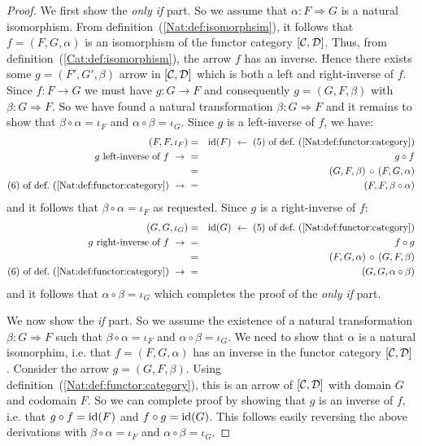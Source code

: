\begin{proof}
    We first show the {\em only if} part. So we assume that 
    $\alpha:F\Rightarrow G$ is a natural isomorphism. From 
    definition~(\ref{Nat:def:isomorphsim}), it follows that
    $f=(F,G,\alpha)$ is an isomorphism of the functor category
    $[\mbox{$\cal C$},\mbox{$\cal D$}]$. Thus, from definition~(\ref{Cat:def:isomorphism}), 
    the arrow $f$ has an inverse. Hence there exists some
    $g=(F',G',\beta)$ arrow in $[\mbox{$\cal C$},\mbox{$\cal D$}]$ which is both a left and
    right-inverse of $f$. Since $f:F\to G$ we must have $g:G\to F$ and
    consequently $g=(G,F,\beta)$ with $\beta:G\Rightarrow F$. So we
    have found a natural transformation $\beta:G\Rightarrow F$ and 
    it remains to show that $\beta\circ\alpha=\iota_{F}$ and 
    $\alpha\circ\beta=\iota_{G}$. Since $g$ is a left-inverse of $f$,
    we have: 
        \begin{eqnarray*}(F,F,\iota_{F})
            &=&\id(F)\ \leftarrow\ 
            \mbox{$(5)$ of def.~(\ref{Nat:def:functor:category})}\\
            \mbox{$g$ left-inverse of $f$}\ \to\ 
            &=&g\circ f\\
            &=&(G,F,\beta)\,\circ\,(F,G,\alpha)\\
            \mbox{$(6)$ of def.~(\ref{Nat:def:functor:category})}\ \to\ 
            &=&(F,F,\beta\circ\alpha)
        \end{eqnarray*}
    and it follows that $\beta\circ\alpha=\iota_{F}$ as requested. Since $g$ is
    a right-inverse of $f$:
        \begin{eqnarray*}(G,G,\iota_{G})
            &=&\id(G)\ \leftarrow\ 
            \mbox{$(5)$ of def.~(\ref{Nat:def:functor:category})}\\
            \mbox{$g$ right-inverse of $f$}\ \to\ 
            &=&f\circ g\\
            &=&(F,G,\alpha)\,\circ\,(G,F,\beta)\\
            \mbox{$(6)$ of def.~(\ref{Nat:def:functor:category})}\ \to\ 
            &=&(G,G,\alpha\circ\beta)
        \end{eqnarray*}
    and it follows that $\alpha\circ\beta=\iota_{G}$ which completes
    the proof of the {\em only if} part.
    
    We now show the {\em if} part. So we assume the existence of a 
    natural transformation $\beta:G\Rightarrow F$ such that 
    $\beta\circ\alpha=\iota_{F}$ and $\alpha\circ\beta=\iota_{G}$.
    We need to show that $\alpha$ is a natural isomorphim, i.e.
    that $f=(F,G,\alpha)$ has an inverse in the functor category
    $[\mbox{$\cal C$},\mbox{$\cal D$}]$. Consider the arrow $g=(G,F,\beta)$. Using 
    definition~(\ref{Nat:def:functor:category}), this is an
    arrow of $[\mbox{$\cal C$},\mbox{$\cal D$}]$ with domain $G$ and codomain $F$.
    So we can complete proof by showing that $g$ is an inverse of
    $f$, i.e. that $g\circ f=\mbox{\rm id}(F)$ and $f\circ g=\mbox{\rm id}(G)$. 
    This follows easily reversing the above derivations with
    $\beta\circ\alpha=\iota_{F}$ and $\alpha\circ\beta=\iota_{G}$.
\end{proof}


